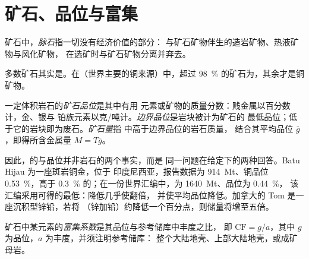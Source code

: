 \section{矿石、品位与富集}\label{sec:b2:ore-deposits:grade}

\begin{definition}[脉石]\label{def:b2:ore-deposits:ore}
矿石中，\emph{脉石}指一切没有经济价值的部分：
与矿石矿物伴生的造岩矿物、热液矿物与风化矿物，
在选矿时与矿石矿物分离并弃去。
\end{definition}

多数矿石其实是。在（世界主要的铜来源）中，超过
\qty{98}{\percent} 的矿石为，其余才是铜矿物。

\begin{definition}\label{def:b2:ore-deposits:grade}
一定体积岩石的\emph{矿石品位}是其中有用
元素或矿物的质量分数：贱金属以百分数计，金、银与
铂族元素以克/吨计。\emph{边界品位}是岩块被计为矿石的
最低品位；低于它的岩块即为废石。\emph{矿石量}指
中高于边界品位的岩石质量，
结合其平均品位 $\bar g$，即得所含金属量 $M = T\bar g$。
\end{definition}

因此，的与品位并非岩石的两个事实，而是
同一问题在给定下的两种回答。Batu Hijau 为一座斑岩铜金，位于
印度尼西亚，报告数据为 \qty{914}{Mt}、铜品位 \qty{0.53}{\percent}，高于
\qty{0.3}{\percent} 的；在一份世界汇编中，为 \qty{1640}{Mt}、品位为 \qty{0.44}{\percent}，
该汇编采用可得的最低：降低几乎使翻倍，
并使平均品位降低。加拿大的 Tom 是一座沉积型锌铅，若将
（锌加铅）约降低一个百分点，则储量将增至五倍。

\begin{definition}[富集系数]\label{def:b2:ore-deposits:cf}
矿石中某元素的\emph{富集系数}是其品位与参考储库中丰度之比，
即 $\mathrm{CF} = g/a$，其中 $g$ 为品位，$a$ 为丰度，并须注明参考储库：
整个大陆地壳、上部大陆地壳，或成矿母岩。
\end{definition}

